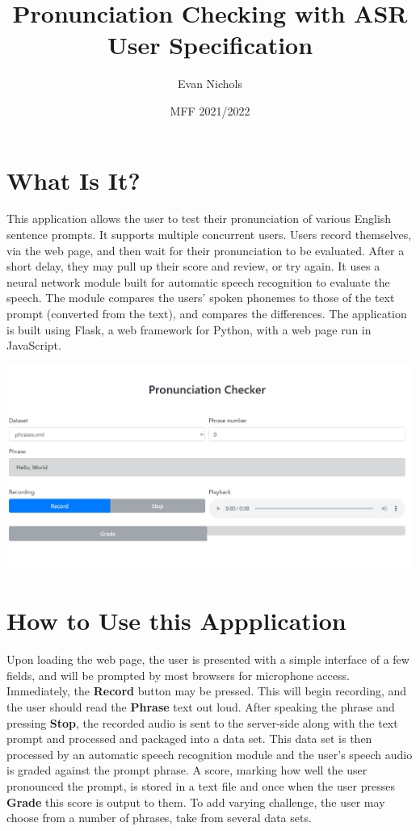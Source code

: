 \documentclass[12pt, letterpaper]{article}
\title{Pronunciation Checking with ASR\\ \small User Specification}
\author{Evan Nichols}
\date{MFF 2021/2022}
\begin{document}
\maketitle

\section*{What Is It?}
This application allows the user to test their pronunciation of various English sentence prompts. It supports multiple concurrent users. Users record themselves, via the web page, and then wait for their pronunciation to be evaluated. After a short delay, they may pull up their score and review, or try again. It uses a neural network module built for automatic speech recognition to evaluate the speech. The module compares the users' spoken phonemes to those of the text prompt (converted from the text), and compares the differences. The application is built using Flask, a web framework for Python, with a web page run in JavaScript. 

\begin{center}
    \includegraphics[scale=0.33]{images/homepage.png}
\end{center}

\newpage%
\section*{How to Use this Appplication}
Upon loading the web page, the user is presented with a simple interface of a few fields, and will be prompted by most browsers for microphone access. Immediately, the \textbf{Record} button may be pressed. This will begin recording, and the user should read the \textbf{Phrase} text out loud. After speaking the phrase and pressing \textbf{Stop}, the recorded audio is sent to the server-side along with the text prompt and processed and packaged into a data set. This data set is then processed by an automatic speech recognition module and the user's speech audio is graded against the prompt phrase. A score, marking how well the user pronounced the prompt, is stored in a text file and once when the user presses \textbf{Grade} this score is output to them. To add varying challenge, the user may choose from a number of phrases, take from several data sets. 
\end{document}
